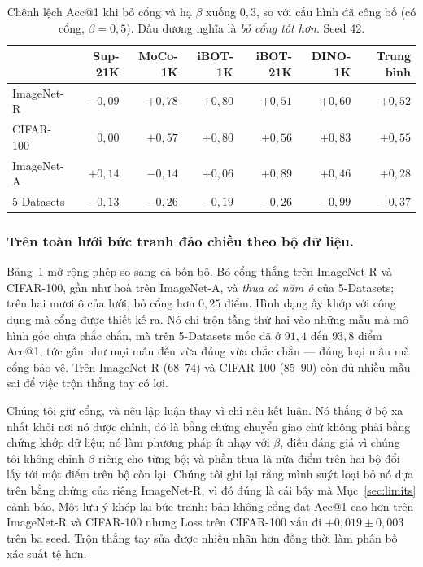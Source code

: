 \documentclass[runningheads]{llncs}
\begin{document}
\begin{table}
\caption{Chênh lệch Acc@1 khi bỏ cổng và hạ $\beta$ xuống $0{,}3$, so với cấu
hình đã công bố (có cổng, $\beta = 0{,}5$). Dấu dương nghĩa là \emph{bỏ cổng tốt
hơn}. Seed 42.}\label{tab:gate-cross}
\begin{tabular}{lrrrrrr}
\hline
& Sup-21K & MoCo-1K & iBOT-1K & iBOT-21K & DINO-1K & Trung bình\\
\hline
ImageNet-R & $-0{,}09$ & $+0{,}78$ & $+0{,}80$ & $+0{,}51$ & $+0{,}60$ & $+0{,}52$\\
CIFAR-100  & $0{,}00$  & $+0{,}57$ & $+0{,}80$ & $+0{,}56$ & $+0{,}83$ & $+0{,}55$\\
ImageNet-A & $+0{,}14$ & $-0{,}14$ & $+0{,}06$ & $+0{,}89$ & $+0{,}46$ & $+0{,}28$\\
5-Datasets & $-0{,}13$ & $-0{,}26$ & $-0{,}19$ & $-0{,}26$ & $-0{,}99$ & $-0{,}37$\\
\hline
\end{tabular}
\end{table}

\subsubsection{Trên toàn lưới bức tranh đảo chiều theo bộ dữ liệu.}
Bảng~\ref{tab:gate-cross} mở rộng phép so sang cả bốn bộ. Bỏ cổng thắng trên
ImageNet-R và CIFAR-100, gần như hoà trên ImageNet-A, và \emph{thua cả năm ô}
của 5-Datasets; trên hai mươi ô của lưới, bỏ cổng hơn $0{,}25$ điểm. Hình dạng
ấy khớp với công dụng mà cổng được thiết kế ra. Nó chỉ trộn tầng thứ hai vào
những mẫu mà mô hình gốc chưa chắc chắn, mà trên 5-Datasets mốc đã ở $91{,}4$
đến $93{,}8$ điểm Acc@1, tức gần như mọi mẫu đều vừa đúng vừa chắc chắn --- đúng
loại mẫu mà cổng bảo vệ. Trên ImageNet-R ($68$--$74$) và CIFAR-100 ($85$--$90$)
còn đủ nhiều mẫu sai để việc trộn thẳng tay có lợi.

Chúng tôi giữ cổng, và nêu lập luận thay vì chỉ nêu kết luận. Nó thắng ở bộ xa
nhất khỏi nơi nó được chỉnh, đó là bằng chứng chuyển giao chứ không phải bằng
chứng khớp dữ liệu; nó làm phương pháp ít nhạy với $\beta$, điều đáng giá vì
chúng tôi không chỉnh $\beta$ riêng cho từng bộ; và phần thua là nửa điểm trên
hai bộ đổi lấy tới một điểm trên bộ còn lại. Chúng tôi ghi lại rằng mình suýt
loại bỏ nó dựa trên bằng chứng của riêng ImageNet-R, vì đó đúng là cái bẫy mà
Mục~\ref{sec:limits} cảnh báo. Một lưu ý khép lại bức tranh: bản không cổng đạt
Acc@1 cao hơn trên ImageNet-R và CIFAR-100 nhưng Loss trên CIFAR-100 xấu đi
$+0{,}019 \pm 0{,}003$ trên ba seed. Trộn thẳng tay sửa được nhiều nhãn hơn đồng
thời làm phân bố xác suất tệ hơn.
\end{document}
